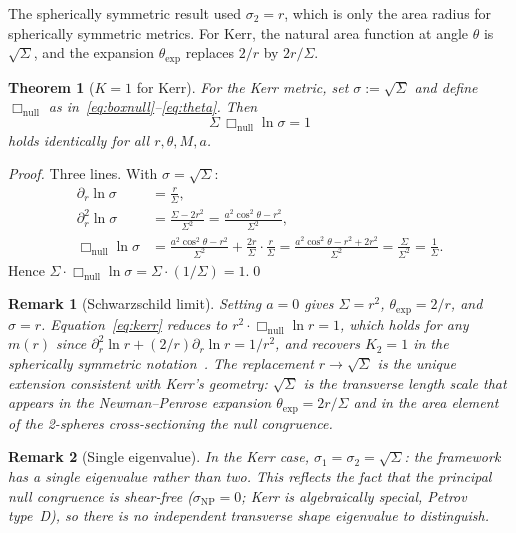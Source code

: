 \documentclass[11pt,a4paper]{article}
\newtheorem{theorem}{Theorem}
\newtheorem*{remark}{Remark}
\begin{document}
The spherically symmetric result used $\sigma_2=r$, which is
only the area radius for spherically symmetric metrics.
For Kerr, the natural area function at angle $\theta$ is
$\sqrt{\Sigma}$, and the expansion $\theta_{\mathrm{exp}}$
replaces $2/r$ by $2r/\Sigma$.

\begin{theorem}[$K{=}1$ for Kerr]\label{thm:kerr}
For the Kerr metric, set $\sigma:=\sqrt{\Sigma}$ and define
$\Box_{\mathrm{null}}$ as in~\eqref{eq:boxnull}--\eqref{eq:theta}.
Then
\begin{equation}\label{eq:kerr}
  \Sigma\,\Box_{\mathrm{null}}\ln\sigma = 1
\end{equation}
holds identically for all $r,\theta,M,a$.
\end{theorem}

\begin{proof}
Three lines. With $\sigma=\sqrt{\Sigma}$:
\begin{align*}
  \partial_r\ln\sigma &= \frac{r}{\Sigma},\\
  \partial_r^2\ln\sigma &= \frac{\Sigma-2r^2}{\Sigma^2}
    = \frac{a^2\cos^2\!\theta-r^2}{\Sigma^2},\\
  \Box_{\mathrm{null}}\ln\sigma
    &= \frac{a^2\cos^2\!\theta-r^2}{\Sigma^2}
      +\frac{2r}{\Sigma}\cdot\frac{r}{\Sigma}
    = \frac{a^2\cos^2\!\theta-r^2+2r^2}{\Sigma^2}
    = \frac{\Sigma}{\Sigma^2}
    = \frac{1}{\Sigma}.
\end{align*}
Hence $\Sigma\cdot\Box_{\mathrm{null}}\ln\sigma
      =\Sigma\cdot(1/\Sigma)=1$.\qed
\end{proof}

\begin{remark}[Schwarzschild limit]
Setting $a=0$ gives $\Sigma=r^2$, $\theta_{\mathrm{exp}}=2/r$,
and $\sigma=r$.  Equation~\eqref{eq:kerr} reduces to
$r^2\cdot\Box_{\mathrm{null}}\ln r=1$, which holds for any
$m(r)$ since $\partial_r^2\ln r+(2/r)\partial_r\ln r=1/r^2$,
and recovers $K_2=1$ in the spherically symmetric notation~\cite{K1}.
The replacement $r\to\sqrt{\Sigma}$ is the unique extension
consistent with Kerr's geometry: $\sqrt{\Sigma}$ is the
transverse length scale that appears in the Newman--Penrose
expansion $\theta_{\mathrm{exp}}=2r/\Sigma$ and in the
area element of the 2-spheres cross-sectioning the null
congruence.
\end{remark}

\begin{remark}[Single eigenvalue]
In the Kerr case, $\sigma_1=\sigma_2=\sqrt{\Sigma}$: the
framework has a single eigenvalue rather than two.
This reflects the fact that the principal null congruence
is shear-free ($\sigma_{\scriptscriptstyle\mathrm{NP}}=0$;
Kerr is algebraically special, Petrov type~D), so there is
no independent transverse shape eigenvalue to distinguish.
\end{remark}
\end{document}
